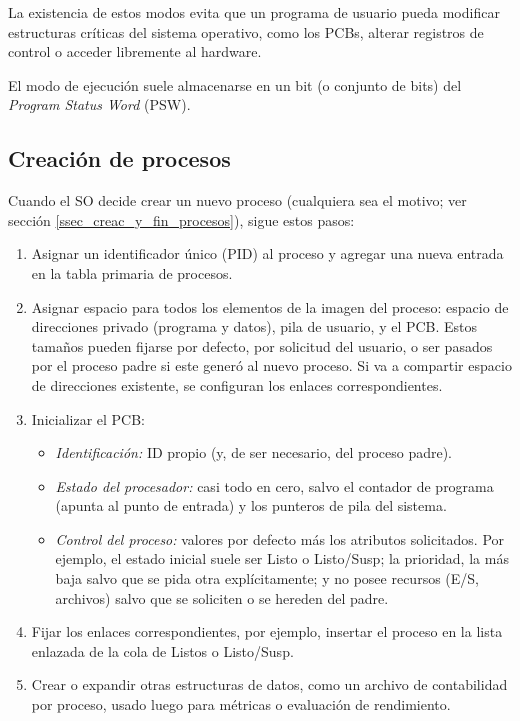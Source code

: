 La existencia de estos modos evita que un programa de usuario pueda modificar estructuras críticas del sistema operativo, como los PCBs, alterar registros de control o acceder libremente al hardware.

El modo de ejecución suele almacenarse en un bit (o conjunto de bits) del \emph{Program Status Word} (PSW).

\subsection{Creación de procesos}

Cuando el SO decide crear un nuevo proceso (cualquiera sea el motivo; ver sección \ref{ssec_creac_y_fin_procesos}), sigue estos pasos:
\begin{enumerate}
  \item Asignar un identificador único (PID) al proceso y agregar una nueva entrada en la tabla primaria de procesos.
  \item Asignar espacio para todos los elementos de la imagen del proceso: espacio de direcciones privado (programa y datos), pila de usuario, y el PCB.
  Estos tamaños pueden fijarse por defecto, por solicitud del usuario, o ser pasados por el proceso padre si este generó al nuevo proceso. Si va a compartir espacio de direcciones existente, se configuran los enlaces correspondientes.
  \item Inicializar el PCB:
  \begin{itemize}
    \item \emph{Identificación:} ID propio (y, de ser necesario, del proceso padre).
    \item \emph{Estado del procesador:} casi todo en cero, salvo el contador de programa (apunta al punto de entrada) y los punteros de pila del sistema.
    \item \emph{Control del proceso:} valores por defecto más los atributos solicitados. Por ejemplo, el estado inicial suele ser Listo o Listo/Susp; la prioridad, la más baja salvo que se pida otra explícitamente; y no posee recursos (E/S, archivos) salvo que se soliciten o se hereden del padre.
  \end{itemize}

  \item Fijar los enlaces correspondientes, por ejemplo, insertar el proceso en la lista enlazada de la cola de Listos o Listo/Susp.

  \item Crear o expandir otras estructuras de datos, como un archivo de contabilidad por proceso, usado luego para métricas o evaluación de rendimiento.
\end{enumerate}

